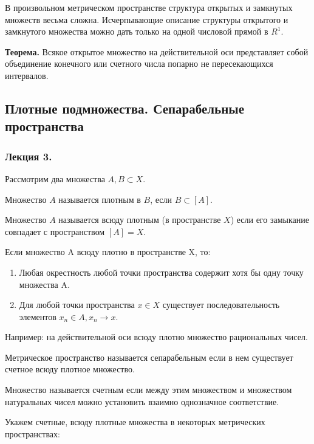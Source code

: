 \documentclass[14pt]{extarticle}
\theoremstyle{definition}
\theoremstyle{remark}
\renewcommand{\[}{\begin{dmath*}[compact]}
\renewcommand{\]}{\end{dmath*}}
\newcommand{\tth}[1][]{\textbf{Теорема#1.}}
\begin{document}
В произвольном метрическом пространстве структура открытых и замкнутых
множеств весьма сложна.
Исчерпывающие описание структуры открытого и замкнутого множества можно дать
только на одной числовой прямой в $R^1$.

\tth[] Всякое открытое множество на действительной оси представляет собой
объединение конечного или счетного числа попарно не пересекающихся интервалов.

\subsection{Плотные подмножества. Сепарабельные пространства}

\subsubsection{Лекция 3.}

Рассмотрим два множества $A, B\subset X$.

Множество $A$ называется плотным в $B$, если $B\subset[A]$.

Множество $A$ называется всюду плотным (в пространстве $X$) если его замыкание
совпадает с пространством $[A]=X$.

Если множество A всюду плотно в пространстве X, то:

\begin{enumerate}
  \item Любая окрестность любой точки пространства содержит хотя бы одну точку
  множества A.

  \item Для любой точки пространства $x \in X$  существует последовательность
  элементов ${x_n}\in A, x_n \to x$.
\end{enumerate}

Например: на действительной оси всюду плотно множество рациональных чисел.

Метрическое пространство называется сепарабельным если в нем существует счетное
всюду плотное множество.

Множество называется счетным если между этим множеством и множеством
натуральных чисел можно установить взаимно однозначное соответствие.

Укажем счетные, всюду плотные множества в некоторых метрических пространствах:
\end{document}
